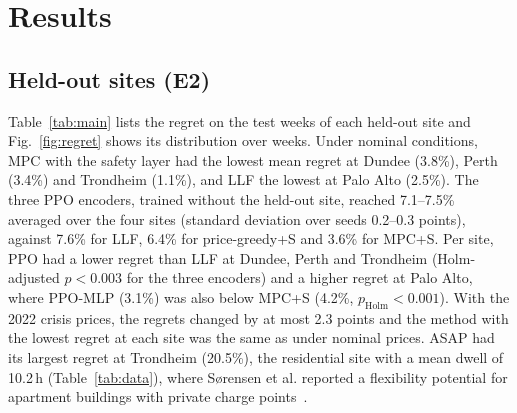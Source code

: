 \documentclass[conference]{IEEEtran}
\begin{document}
\section{Results}
\subsection{Held-out sites (E2)}
Table~\ref{tab:main} lists the regret on the test weeks of each held-out site and Fig.~\ref{fig:regret}
shows its distribution over weeks. Under nominal conditions, MPC with the safety layer had the lowest
mean regret at Dundee (3.8\%), Perth (3.4\%) and Trondheim (1.1\%), and LLF the lowest at Palo Alto
(2.5\%). The three PPO encoders, trained without the held-out site, reached 7.1--7.5\% averaged over
the four sites (standard deviation over seeds 0.2--0.3 points), against 7.6\% for LLF, 6.4\% for
price-greedy+S and 3.6\% for MPC+S. Per site, PPO had a lower regret than LLF at Dundee, Perth and
Trondheim (Holm-adjusted $p<0.003$ for the three encoders) and a higher regret at Palo Alto, where
PPO-MLP (3.1\%) was also below MPC+S (4.2\%, $p_\mathrm{Holm}<0.001$). With the 2022 crisis prices, the regrets changed by at most 2.3 points and the method with the lowest
regret at each site was the same as under nominal prices. ASAP had its largest regret at Trondheim
(20.5\%), the residential site with a mean dwell of 10.2\,h (Table~\ref{tab:data}), where S{\o}rensen et al. reported a
flexibility potential for apartment buildings with private charge points~\cite{sorensen2021flex}.
\end{document}
